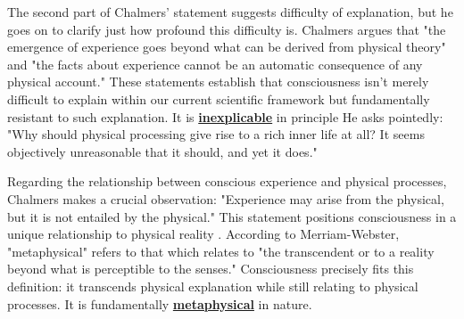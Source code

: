 \documentclass[runningheads]{llncs}
\newcommand{\link}[2]{%
\href{#1}{\textcolor{wikiblue}{#2}\xspace}%
}
\newcommand{\repo}[2]{%
\link{https://github.com/DNA-Platform/inexplicable-phenomena/blob/main/#1}{#2}\xspace%
}
\newcommand{\inexplicable}[0]{%
\repo{research/consciousness/a-novel-perspective-on-vision.md}{inexplicable}%
}
\newcommand{\metaphysical}[0]{%
\repo{research/consciousness/a-novel-perspective-on-vision.md}{metaphysical}%
}
\begin{document}
The second part of Chalmers' statement suggests difficulty of explanation, but he goes on to clarify just how profound this difficulty is. Chalmers argues that "the emergence of experience goes beyond what can be derived from physical theory" and "the facts about experience cannot be an automatic consequence of any physical account." These statements establish that consciousness isn't merely difficult to explain within our current scientific framework but fundamentally resistant to such explanation. It is \textbf{\inexplicable} in principle He asks pointedly: "Why should physical processing give rise to a rich inner life at all? It seems objectively unreasonable that it should, and yet it does."

Regarding the relationship between conscious experience and physical processes, Chalmers makes a crucial observation: "Experience may arise from the physical, but it is not entailed by the physical." This statement positions consciousness in a unique relationship to physical reality \cite{Smullyan1992}\cite{Tarski1935}. According to Merriam-Webster, "metaphysical" refers to that which relates to "the transcendent or to a reality beyond what is perceptible to the senses." Consciousness precisely fits this definition: it transcends physical explanation while still relating to physical processes. It is fundamentally \textbf{\metaphysical} in nature.
\end{document}
